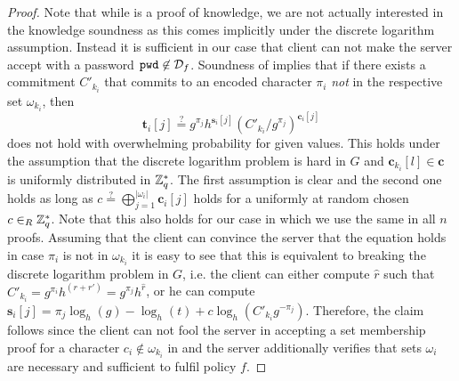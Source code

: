 \begin{proof}
Note that while \PoM is a proof of knowledge, we are not actually interested in the knowledge soundness as this comes implicitly under the discrete logarithm assumption.
Instead it is sufficient in our case that client \Client can not make the server accept \PoM with a password $\mathtt{pwd}\not\in\mathcal{D}_f$.
Soundness of \PoM implies that if there exists a commitment $C'_{k_i}$ that commits to an encoded character $\pi_i$ \emph{not} in the respective set $\omega_{k_i}$, then
\[ \bm t_i[j] \stackrel{?}{=} g^{\pi_j}h^{\bm s_i[j]}(C'_{k_i}/g^{\pi_j})^{\bm c_i[j]} \]
does not hold with overwhelming probability for given values.
This holds under the assumption that the discrete logarithm problem is hard in $G$ and $\bm c_{k_i}[l] \in \bm c$ is uniformly distributed in $\mathbb{Z}^\ast_q$.
The first assumption is clear and the second one holds as long as $c\stackrel{?}{=}\bigoplus_{j=1}^{|\omega_i|}\bm c_i[j]$ holds for a uniformly at random chosen $c\in_R\mathbb{Z}^\ast_q$.
Note that this also holds for our case in which we use the same \Client in all $n$ proofs.
Assuming that the client can convince the server that the equation holds in case $\pi_i$ is not in $\omega_{k_i}$ it is easy to see that this is equivalent to breaking the discrete logarithm problem in $G$, i.e. the client can either compute $\hat{r}$ such that $C'_{k_i}=g^{\pi_i}h^{(r+r')}=g^{\pi_j}h^{\hat{r}}$, or he can compute $\bm s_i[j]=\pi_j \log_h(g) - \log_h(t) + c\log_h(C'_{k_i}g^{-\pi_j})$.
Therefore, the claim follows since the client can not fool the server in accepting a set membership proof for a character $c_i\not\in\omega_{k_i}$ in \pwd and the server additionally verifies that sets $\omega_i$ are necessary and sufficient to fulfil policy $f$.

\end{proof}

% 
% 
% 
